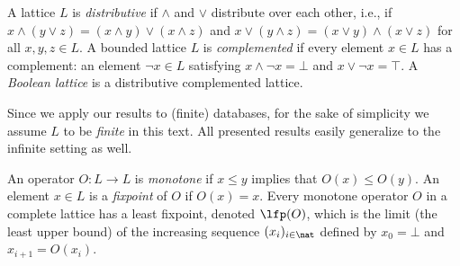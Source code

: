 A lattice $L$ is \emph{distributive} if $\land$ and $\lor$ distribute over each other, i.e., if $x\land(y\lor z)=(x\land y)\lor(x\land z)$ and $x\lor(y\land z)=(x\lor y)\land(x\lor z)$ for all $x,y,z\in L$.
A bounded lattice $L$ is \emph{complemented} if every element $x\in L$ has a complement: an element $\lnot x \in L$
satisfying $x\land \lnot x = \bot $ and $x\lor \lnot x = \top$. A \emph{Boolean lattice} is a distributive
complemented lattice.

Since we apply our results to (finite) databases, for the sake of simplicity we assume $L$ to be \emph{finite} in this text. All presented results easily generalize to the infinite setting as well. 



An operator $O:L\to L$ is \emph{monotone} if $x\leq y$ implies that $O(x)\leq O(y)$.
An element $x\in L$ is 
a \emph{fixpoint}
of $O$ if
$O(x)=x$.
Every monotone operator $O$ in a %
complete lattice has a least fixpoint, denoted $\lfp(O)$, which is 
the limit (the least upper bound) of the increasing sequence $(x_i)_{i \in \nat}$ defined by $x_0=\bot$ and $x_{i+1} = O(x_i)$. 


